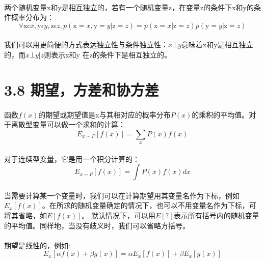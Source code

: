 \documentclass{article}
\begin{document}
    \paragraph{}
    两个随机变量x和y是相互独立的，若有一个随机变量z，在变量z的条件下x和y的条件概率分布为：
    \begin{equation}
    \forall \mathrm{x}\epsilon x,\mathrm{y}\epsilon y,\mathrm{z}\epsilon z,p( \mathrm{x}=x,\mathrm{y}=y|\mathrm{z}=z )=p( \mathrm{x}=x|\mathrm{z}=z)p(\mathrm{y}=y|\mathrm{z}=z ) \tag{3.8}
    \end{equation}
    \paragraph{}
    我们可以用更简便的方式表达独立性与条件独立性：$x\bot y $意味着x和y是相互独立的，而$x\bot y | z$则表示x和y 在z的条件下是相互独立的。


     \section*{3.8 期望，方差和协方差}
    \paragraph{}
    函数$f(x)$的期望或期望值是x与其相对应的概率分布$P(x)$的乘积的平均值。对于离散型变量可以做一个求和的计算：
    \begin{equation}
     E_{x\sim P}[f(x)]=\sum _x P(x)f(x)  \tag{3.9}
    \end{equation}
    \paragraph{}
    对于连续型变量，它是用一个积分计算的：
    \begin{equation}
       E_{x\sim P}[f(x)]=\int P(x)f(x)dx   \tag{3.10}
    \end{equation}
    \paragraph{}
    当需要计算某一个变量时，我们可以在计算期望用其变量名作为下标，例如$E_x[f(x)]$。在所求的随机变量确定的情况下，也可以不用变量名作为下标，可将其省略，如$E[f(x)]$。 默认情况下，可以用$E[?]$表示所有括号内的随机变量的平均值。同样地，当没有歧义时，我们可以省略方括号。
    \paragraph{}
    期望是线性的，例如:
    \begin{equation}
      E_x [\alpha f(x)+\beta g(x)]=\alpha E_x[f(x)]+\beta E_x[g(x)]  \tag{3.11}
    \end{equation}
\end{document}
